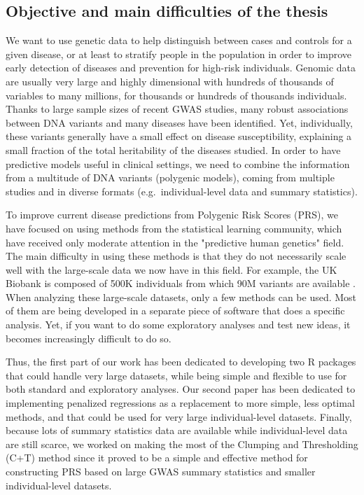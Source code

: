 \subsection{Objective and main difficulties of the thesis}

We want to use genetic data to help distinguish between cases and controls for a given disease, or at least to stratify people in the population in order to improve early detection of diseases and prevention for high-risk individuals.
Genomic data are usually very large and highly dimensional with hundreds of thousands of variables to many millions, for thousands or hundreds of thousands individuals.
Thanks to large sample sizes of recent GWAS studies, many robust associations between DNA variants and many diseases have been identified. Yet, individually, these variants generally have a small effect on disease susceptibility, explaining a small fraction of the total heritability of the diseases studied. 
In order to have predictive models useful in clinical settings, we need to combine the information from a multitude of DNA variants (polygenic models), coming from multiple studies and in diverse formats (e.g.\ individual-level data and summary statistics).

To improve current disease predictions from Polygenic Risk Scores (PRS), we have focused on using methods from the statistical learning community, which have received only moderate attention in the "predictive human genetics" field.
The main difficulty in using these methods is that they do not necessarily scale well with the large-scale data we now have in this field.
For example, the UK Biobank is composed of 500K individuals from which 90M variants are available \cite[]{bycroft2017genome}.
When analyzing these large-scale datasets, only a few methods can be used.
Most of them are being developed in a separate piece of software that does a specific analysis.
Yet, if you want to do some exploratory analyses and test new ideas, it becomes increasingly difficult to do so.

Thus, the first part of our work has been dedicated to developing two R packages that could handle very large datasets, while being simple and flexible to use for both standard and exploratory analyses. 
Our second paper has been dedicated to implementing penalized regressions as a replacement to more simple, less optimal methods, and that could be used for very large individual-level datasets.
Finally, because lots of summary statistics data are available while individual-level data are still scarce, we worked on making the most of the Clumping and Thresholding (C+T) method since it proved to be a simple and effective method for constructing PRS based on large GWAS summary statistics and smaller individual-level datasets.
